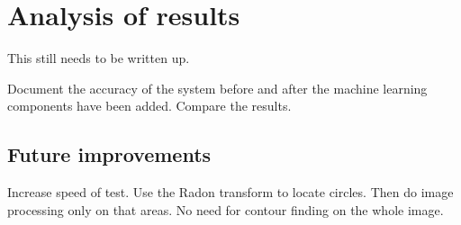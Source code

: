 \chapter{Analysis of results}
\label{ch:Results}
\ifpdf
\graphicspath{{Chapter5/Chapter5Figures/}}
\fi

This still needs to be written up.

Document the accuracy of the system before and after the machine learning components have been added. Compare the results.

\section{Future improvements}

Increase speed of test. Use the Radon transform to locate circles. Then do image processing only on that areas. No need for contour finding on the whole image.
